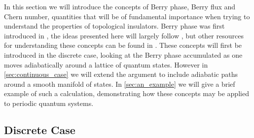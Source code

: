 
In this section we will introduce the concepts of Berry phase, Berry flux and Chern number, quantities that will be of fundamental importance when trying to understand the properties of topological insulators. Berry phase was first introduced in \cite{berry_quantal_1984}, the ideas presented here will largely follow \cite{asboth_short_2016}, but other resources for understanding these concepts can be found in \cite{resta_geometry_2020,bohm_geometric_2003}. These concepts will first be introduced in the discrete case, looking at the Berry phase accumulated as one moves adiabatically around a lattice of quantum states. However in \textsection\ref{sec:continuous_case} we will extend the argument to include adiabatic paths around a smooth manifold of states. In \textsection\ref{sec:an_example} we will give a brief example of such a calculation, demonstrating how these concepts may be applied to periodic quantum systems.

\subsection{Discrete Case}

